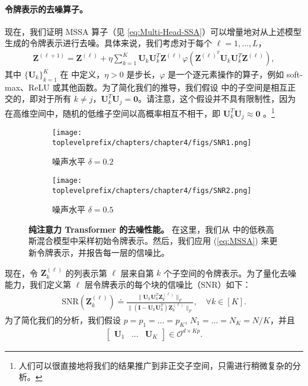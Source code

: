 \documentclass[../../book-main.tex]{subfiles}
\begin{document}
\paragraph{令牌表示的去噪算子。} 现在，我们证明 MSSA 算子（见 \eqref{eq:Multi-Head-SSA}）可以增量地对从上述模型生成的令牌表示进行去噪。具体来说，我们考虑对于每个 $\ell =1 ,\dots,L$，
\begin{align}\label{eq:MSSA}
    \bm Z^{(\ell+1)} =  \bm Z^{(\ell)} + \eta \sum_{k=1}^K \bm U_k\bm U_k^T \bm Z^{(\ell)} \varphi \left(\bm Z^{(\ell)^T}\bm U_k\bm U_k^T\bm Z^{(\ell)} \right),
\end{align}
其中 $\{\bm U_k\}_{k=1}^K$ 在  中定义，$\eta > 0$ 是步长，$\varphi$ 是一个逐元素操作的算子，例如 soft-max、ReLU 或其他函数。为了简化我们的推导，我们假设  中的子空间是相互正交的，即对于所有 $k \neq j$，$\bm U_k^T\bm U_j = \bm 0$。请注意，这个假设并不具有限制性，因为在高维空间中，随机的低维子空间以高概率相互不相干，即 $\bm U_k^T\bm U_j \approx \bm 0$ \citep{Wright-Ma-2021}。\footnote{人们可以很直接地将我们的结果推广到非正交子空间，只需进行稍微复杂的分析。}

\begin{figure}[t]
    \begin{subfigure}[t]{0.45\textwidth}
        \centering
        \texttt{[image: \\toplevelprefix/chapters/chapter4/figs/SNR1.png]}
        \caption{噪声水平 $\delta = 0.2$}
    \end{subfigure}
    \hfill
    \begin{subfigure}[t]{0.45\textwidth}
        \centering
        \texttt{[image: \\toplevelprefix/chapters/chapter4/figs/SNR2.png]}
        \caption{噪声水平 $\delta = 0.5$}
    \end{subfigure}
    \caption{{\bf 纯注意力 Transformer 的去噪性能。} 在这里，我们从  中的低秩高斯混合模型中采样初始令牌表示。然后，我们应用 (\ref{eq:MSSA}) 来更新令牌表示，并报告每一层的信噪比。}  \label{fig:MSSA}
\end{figure}


现在，令 $\bm Z_k^{(\ell)}$ 的列表示第 $\ell$ 层来自第 $k$ 个子空间的令牌表示。为了量化去噪能力，我们定义第 $\ell$ 层令牌表示的每个块的信噪比（SNR）如下：
\begin{align}\label{def:SNR}
\mathrm{SNR}(\bm Z_k^{(\ell)}) \doteq  \frac{\|\bm U_k\bm U_k^T\bm Z_k^{(\ell)} \|_F}{\|(\bm I - \bm U_k\bm U_k^T)\bm Z_k^{(\ell)} \|_F},\quad \forall k \in [K].
\end{align}
为了简化我们的分析，我们假设 $p=p_1=\dots=p_K$, $N_1=\dots=N_K=N/K$，并且
\begin{align}\label{eq:orth}
\begin{bmatrix}
\bm U_1 & \dots & \bm U_K
\end{bmatrix} \in \mathcal{O}^{d\times Kp}.
\end{align}
\end{document}

